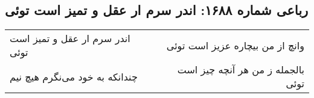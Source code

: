 \begin{center}
\section*{رباعی شماره ۱۶۸۸: اندر سرم ار عقل و تمیز است توئی}
\label{sec:1688}
\begin{longtable}{l p{0.5cm} r}
اندر سرم ار عقل و تمیز است توئی
&&
وانچ از من بیچاره عزیز است توئی
\\
چندانکه به خود می‌نگرم هیچ نیم
&&
بالجمله ز من هر آنچه چیز است توئی
\\
\end{longtable}
\end{center}
